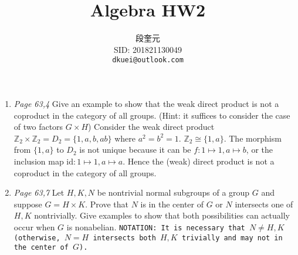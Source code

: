 \documentclass{article}%
\def\zz{\mathbb{Z}}
\def\email#1{{\texttt{#1}}}
\newcommand{\isep}[1][0pt]{\addtolength{\itemsep}{#1}}
\begin{document}
\title{Algebra HW2}
\author{段奎元\\ %
SID: 201821130049\\ %
\email{dkuei@outlook.com}} %
\maketitle

\begin{enumerate}
\isep[1em]
\item%
\prob
	\textit{Page 63,4} Give an example to show that the weak direct product is not a coproduct in the category of all groups. (Hint: it suffices to consider the case of two factors $G\times H$)
\soln
  Consider the weak direct product $\zz_2 \times \zz_2=D_2=\{1,a,b,ab\}$ where $a^2=b^2=1$. $\zz_2\cong\{1,a\}$. 
  The morphism from $\{1,a\}$ to $D_2$ is not unique because it can be $f: 1\mapsto 1, a\mapsto b$,  or the inclusion map $\mathrm{id}: 1\mapsto 1, a\mapsto a$. Hence the (weak) direct product is not a coproduct in the category of all groups.
\endps
\item%
\prob
	\textit{Page 63,7} Let $H,K,N$ be nontrivial normal subgroups of a group $G$ and suppose $G=H\times K$. Prove that $N$ is in the center of $G$ or $N$ intersects one of $H,K$ nontrivially. Give examples to show that both possibilities can actually occur when $G$ is nonabelian.
\soln
\texttt{NOTATION: It is necessary that $N\neq H,K$ (otherwise, $N=H$ intersects both $H,K$ trivially and may not in the center of $G$).}


\end{enumerate}
\end{document}
